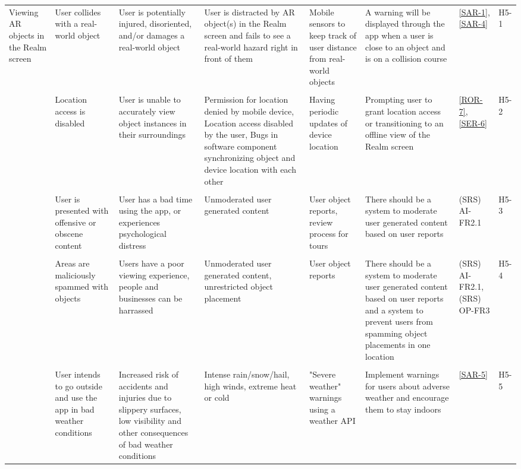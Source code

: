 \documentclass{article}
\begin{document}
\begin{landscape}
\begin{table}[hp]
\begin{footnotesize}
\begin{tabular}{|p{1in}|p{1in}|p{1.5in}|p{1.5in}|p{1.5in}|p{2in}|p{0.4in}|p{0.4in}|}
        \hline
        Viewing AR objects in the Realm screen & User collides with a real-world object & User is potentially injured, disoriented, and/or damages a real-world object & User is distracted by AR object(s) in the Realm screen and fails to see a real-world hazard right in front of them & Mobile sensors to keep track of user distance from real-world objects & A warning will be displayed through the app when a user is close to an object and is on a collision course & \ref{SAR-1}, \ref{SAR-4} & H5-1 \\
        & & & & & & & \\
        & Location access is disabled & User is unable to accurately view object instances in their surroundings & Permission for location denied by mobile device, Location access disabled by the user, Bugs in software component synchronizing object and device location with each other & Having periodic updates of device location & Prompting user to grant location access or transitioning to an offline view of the Realm screen & \ref{ROR-7}, \ref{SER-6} & H5-2 \\
        & & & & & & & \\
        & User is presented with offensive or obscene content & User has a bad time using the app, or experiences psychological distress & Unmoderated user generated content & User object reports, review process for tours & There should be a system to moderate user generated content based on user reports & (SRS) AI-FR2.1 & H5-3 \\
        & & & & & & & \\
        & Areas are maliciously spammed with objects & Users have a poor viewing experience, people and businesses can be harrassed & Unmoderated user generated content, unrestricted object placement & User object reports & There should be a system to moderate user generated content based on user reports and a system to prevent users from spamming object placements in one location & (SRS) AI-FR2.1, (SRS) OP-FR3 & H5-4 \\
        & & & & & & & \\
        &  User intends to go outside and use the app in bad weather conditions & Increased risk of accidents and injuries due to slippery surfaces, low visibility and other consequences of bad weather conditions & Intense rain/snow/hail, high winds, extreme heat or cold & "Severe weather" warnings using a weather API & Implement warnings for users about adverse weather and encourage them to stay indoors & \ref{SAR-5} & H5-5 \\
        \hline
    \end{tabular}
    \end{footnotesize}
\end{table}
\end{landscape}
\restoregeometry
\end{document}
